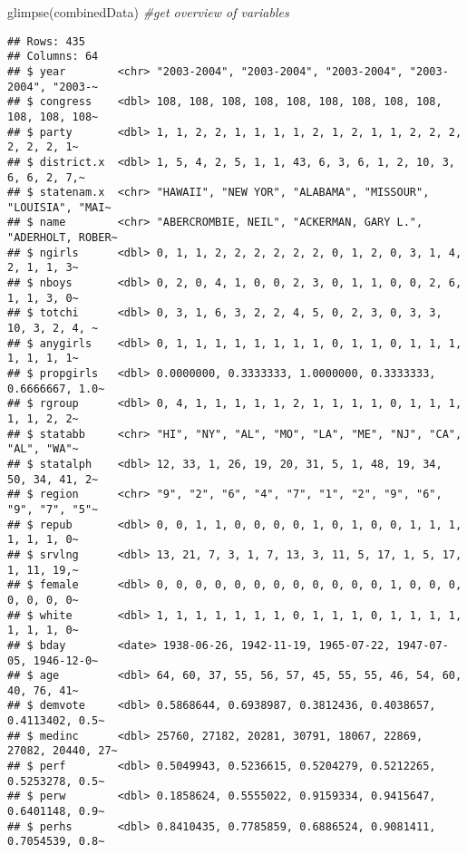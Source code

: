 \documentclass[
]{article}
\newenvironment{Shaded}{\begin{snugshade}}{\end{snugshade}}
\newcommand{\CommentTok}[1]{\textcolor[rgb]{0.56,0.35,0.01}{\textit{#1}}}
\newcommand{\FunctionTok}[1]{\textcolor[rgb]{0.00,0.00,0.00}{#1}}
\newcommand{\NormalTok}[1]{#1}
\begin{document}
\begin{Shaded}
\begin{Highlighting}[]
\FunctionTok{glimpse}\NormalTok{(combinedData)   }\CommentTok{\#get overview of variables}
\end{Highlighting}
\end{Shaded}

\begin{verbatim}
## Rows: 435
## Columns: 64
## $ year        <chr> "2003-2004", "2003-2004", "2003-2004", "2003-2004", "2003-~
## $ congress    <dbl> 108, 108, 108, 108, 108, 108, 108, 108, 108, 108, 108, 108~
## $ party       <dbl> 1, 1, 2, 2, 1, 1, 1, 1, 2, 1, 2, 1, 1, 2, 2, 2, 2, 2, 2, 1~
## $ district.x  <dbl> 1, 5, 4, 2, 5, 1, 1, 43, 6, 3, 6, 1, 2, 10, 3, 6, 6, 2, 7,~
## $ statenam.x  <chr> "HAWAII", "NEW YOR", "ALABAMA", "MISSOUR", "LOUISIA", "MAI~
## $ name        <chr> "ABERCROMBIE, NEIL", "ACKERMAN, GARY L.", "ADERHOLT, ROBER~
## $ ngirls      <dbl> 0, 1, 1, 2, 2, 2, 2, 2, 2, 0, 1, 2, 0, 3, 1, 4, 2, 1, 1, 3~
## $ nboys       <dbl> 0, 2, 0, 4, 1, 0, 0, 2, 3, 0, 1, 1, 0, 0, 2, 6, 1, 1, 3, 0~
## $ totchi      <dbl> 0, 3, 1, 6, 3, 2, 2, 4, 5, 0, 2, 3, 0, 3, 3, 10, 3, 2, 4, ~
## $ anygirls    <dbl> 0, 1, 1, 1, 1, 1, 1, 1, 1, 0, 1, 1, 0, 1, 1, 1, 1, 1, 1, 1~
## $ propgirls   <dbl> 0.0000000, 0.3333333, 1.0000000, 0.3333333, 0.6666667, 1.0~
## $ rgroup      <dbl> 0, 4, 1, 1, 1, 1, 1, 2, 1, 1, 1, 1, 0, 1, 1, 1, 1, 1, 2, 2~
## $ statabb     <chr> "HI", "NY", "AL", "MO", "LA", "ME", "NJ", "CA", "AL", "WA"~
## $ statalph    <dbl> 12, 33, 1, 26, 19, 20, 31, 5, 1, 48, 19, 34, 50, 34, 41, 2~
## $ region      <chr> "9", "2", "6", "4", "7", "1", "2", "9", "6", "9", "7", "5"~
## $ repub       <dbl> 0, 0, 1, 1, 0, 0, 0, 0, 1, 0, 1, 0, 0, 1, 1, 1, 1, 1, 1, 0~
## $ srvlng      <dbl> 13, 21, 7, 3, 1, 7, 13, 3, 11, 5, 17, 1, 5, 17, 1, 11, 19,~
## $ female      <dbl> 0, 0, 0, 0, 0, 0, 0, 0, 0, 0, 0, 0, 1, 0, 0, 0, 0, 0, 0, 0~
## $ white       <dbl> 1, 1, 1, 1, 1, 1, 1, 0, 1, 1, 1, 0, 1, 1, 1, 1, 1, 1, 1, 0~
## $ bday        <date> 1938-06-26, 1942-11-19, 1965-07-22, 1947-07-05, 1946-12-0~
## $ age         <dbl> 64, 60, 37, 55, 56, 57, 45, 55, 55, 46, 54, 60, 40, 76, 41~
## $ demvote     <dbl> 0.5868644, 0.6938987, 0.3812436, 0.4038657, 0.4113402, 0.5~
## $ medinc      <dbl> 25760, 27182, 20281, 30791, 18067, 22869, 27082, 20440, 27~
## $ perf        <dbl> 0.5049943, 0.5236615, 0.5204279, 0.5212265, 0.5253278, 0.5~
## $ perw        <dbl> 0.1858624, 0.5555022, 0.9159334, 0.9415647, 0.6401148, 0.9~
## $ perhs       <dbl> 0.8410435, 0.7785859, 0.6886524, 0.9081411, 0.7054539, 0.8~

\end{verbatim}
\end{document}
